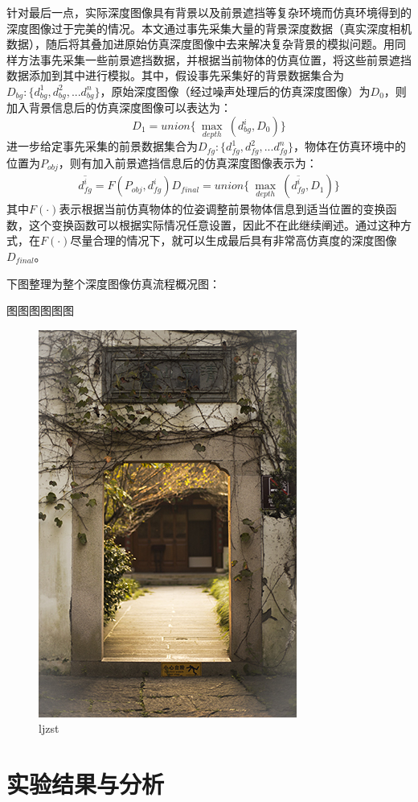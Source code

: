 针对最后一点，实际深度图像具有背景以及前景遮挡等复杂环境而仿真环境得到的深度图像过于完美的情况。本文通过事先采集大量的背景深度数据（真实深度相机数据），随后将其叠加进原始仿真深度图像中去来解决复杂背景的模拟问题。用同样方法事先采集一些前景遮挡数据，并根据当前物体的仿真位置，将这些前景遮挡数据添加到其中进行模拟。其中，假设事先采集好的背景数据集合为$D_{bg}:\{d_{bg}^1,d_{bg}^2,...d_{bg}^n\}$，原始深度图像（经过噪声处理后的仿真深度图像）为$D_0$，则加入背景信息后的仿真深度图像可以表达为：
\begin{equation}
	D_1=union\{\ \max_{depth}\ (d_{bg}^i, D_0)\}
\end{equation}
进一步给定事先采集的前景数据集合为$D_{fg}:\{d_{fg}^1,d_{fg}^2,...d_{fg}^n\}$，物体在仿真环境中的位置为$P_{obj}$，则有加入前景遮挡信息后的仿真深度图像表示为：
\begin{equation}
\begin{aligned}
	\overline{d_{fg}^i} = F(P_{obj},d_{fg}^i)
	D_{final}=union\{\ \max_{depth}\ (\overline{d_{fg}^i}, D_1)\}
\end{aligned}
\end{equation}
其中$F(\cdot)$表示根据当前仿真物体的位姿调整前景物体信息到适当位置的变换函数，这个变换函数可以根据实际情况任意设置，因此不在此继续阐述。通过这种方式，在$F(\cdot)$尽量合理的情况下，就可以生成最后具有非常高仿真度的深度图像$D_{final}$。

下图整理为整个深度图像仿真流程概况图：

图图图图图图
\begin{figure}[htb]
	\centering 
	\includegraphics[scale=1.0]{./Pictures/test.jpg} 
	\caption{ljzst} 
\end{figure}






\section{实验结果与分析}












